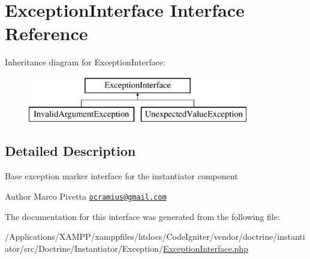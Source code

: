 \hypertarget{interface_doctrine_1_1_instantiator_1_1_exception_1_1_exception_interface}{}\section{Exception\+Interface Interface Reference}
\label{interface_doctrine_1_1_instantiator_1_1_exception_1_1_exception_interface}
Inheritance diagram for Exception\+Interface\+:\begin{figure}[H]
\begin{center}
\leavevmode
\includegraphics[height=2.000000cm]{interface_doctrine_1_1_instantiator_1_1_exception_1_1_exception_interface}
\end{center}
\end{figure}


\subsection{Detailed Description}
Base exception marker interface for the instantiator component

\begin{DoxyAuthor}{Author}
Marco Pivetta \href{mailto:ocramius@gmail.com}{\tt ocramius@gmail.\+com} 
\end{DoxyAuthor}


The documentation for this interface was generated from the following file\+:\begin{DoxyCompactItemize}
\item 
/\+Applications/\+X\+A\+M\+P\+P/xamppfiles/htdocs/\+Code\+Igniter/vendor/doctrine/instantiator/src/\+Doctrine/\+Instantiator/\+Exception/\mbox{\hyperlink{doctrine_2instantiator_2src_2_doctrine_2_instantiator_2_exception_2_exception_interface_8php}{Exception\+Interface.\+php}}\end{DoxyCompactItemize}
